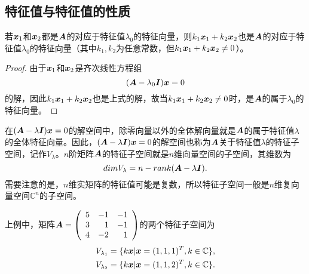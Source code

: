 \subsection{特征值与特征值的性质}



\begin{dingli}
  若${\boldsymbol{x}}_1$和${\boldsymbol{x}}_2$都是$\boldsymbol{A}$的对应于特征值$\lambda_0$的特征向量，则$k_1{\boldsymbol{x}}_1+k_2{\boldsymbol{x}}_2$也是$\boldsymbol{A}$的对应于特征值$\lambda_0$的特征向量（其中$k_1,k_2$为任意常数，但$k_1{\boldsymbol{x}}_1+k_2{\boldsymbol{x}}_2\ne 0$）。
\end{dingli}

\begin{proof}
  由于${\boldsymbol{x}}_1$和${\boldsymbol{x}}_2$是齐次线性方程组
  $$
  (\boldsymbol{A}-\lambda_0\boldsymbol{I}){\boldsymbol{x}}=0
  $$
  的解，因此$k_1{\boldsymbol{x}}_1+k_2{\boldsymbol{x}}_2$也是上式的解，故当$k_1{\boldsymbol{x}}_1+k_2{\boldsymbol{x}}_2\ne0$时，是$\boldsymbol{A}$的属于$\lambda_0$的特征向量。
\end{proof}

在$(\boldsymbol{A}-\lambda\boldsymbol{I}){\boldsymbol{x}}=0$的解空间中，除零向量以外的全体解向量就是$\boldsymbol{A}$的属于特征值$\lambda$的全体特征向量。因此，$(\boldsymbol{A}-\lambda\boldsymbol{I}){\boldsymbol{x}}=0$的解空间也称为$\boldsymbol{A}$关于特征值$\lambda$的特征子空间，记作$V_\lambda$。$n$阶矩阵$\boldsymbol{A}$的特征子空间就是$n$维向量空间的子空间，其维数为
$$
dim V_\lambda = n - rank(\boldsymbol{A}-\lambda \boldsymbol{I}).
$$
需要注意的是，$n$维实矩阵的特征值可能是复数，所以特征子空间一般是$n$维复向量空间$\mathbb C^n$的子空间。

上例中，矩阵$\boldsymbol{A}=\left(
    \begin{array}{rrr}
      5&-1&-1\\
      3&1&-1\\
      4&-2&1
    \end{array}
  \right)$的两个特征子空间为
  $$
  \begin{aligned}
    V_{\lambda_1}=\{k{\boldsymbol{x}} | {\boldsymbol{x}} = (1,1,1)^T, k \in \mathbb C\},\\
    V_{\lambda_2}=\{k{\boldsymbol{x}} | {\boldsymbol{x}} = (1,1,2)^T, k \in \mathbb C\}.
  \end{aligned}
  $$

